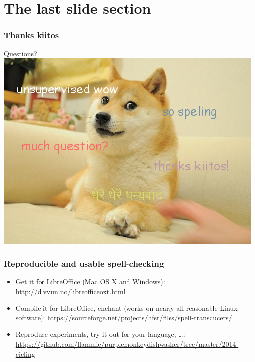 \documentclass[t,12pt]{beamer}
\begin{document}
\section{The last slide section}

\begin{frame}
    \frametitle{Thanks kiitos }
    Questions?
    \includegraphics[width=\textwidth]{questions-doge}
\end{frame}

\begin{frame}
    \frametitle{Reproducible and usable spell-checking}
    \begin{itemize}
        \item Get it for LibreOffice (Mac OS X and Windows):
            \url{http://divvun.no/libreofficeoxt.html}
        \item Compile it for LibreOffice, enchant (works on nearly all
            reasonable Linux software):
            \url{https://sourceforge.net/projects/hfst/files/spell-transducers/}
        \item Reproduce experiments, try it out for your language, \ldots:
            \url{https://github.com/flammie/purplemonkeydishwasher/tree/master/2014-cicling}
    \end{itemize}
\end{frame}
\end{document}
